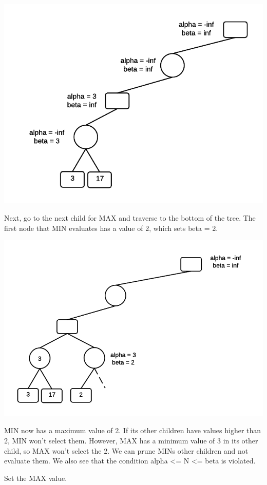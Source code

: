 \documentclass[11pt]{article}
\makeatletter
\def\maxwidth{\ifdim\Gin@nat@width>\linewidth\linewidth
    \else\Gin@nat@width\fi}
\let\Oldincludegraphics\includegraphics
\renewcommand{\includegraphics}[1]{\Oldincludegraphics[width=.8\maxwidth]{#1}}
\makeatother
\begin{document}
\includegraphics{img/ABExample3.png}

Next, go to the next child for MAX and traverse to the bottom of the
tree. The first node that MIN evaluates has a value of 2, which sets
beta = 2.

\includegraphics{img/ABExample4.png}

MIN now has a maximum value of 2. If its other children have values
higher than 2, MIN won't select them. However, MAX has a minimum value
of 3 in its other child, so MAX won't select the 2. We can prune MINs
other children and not evaluate them. We also see that the condition
alpha \textless{}= N \textless{}= beta is violated.

Set the MAX value.
\end{document}

